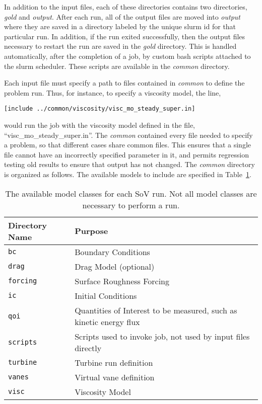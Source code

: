 In addition to the input files, each of these directories contains two
directories, {\it gold} and {\it output}. After each run, all of the
output files are moved into {\it output} where they are saved in a
directory labeled by the unique slurm id for that particular run. In
addition, if the run exited successfully, then the output files
necessary to restart the run are saved in the {\it gold} directory. 
This is handled automatically, after the completion of a job, by custom
bash scripts attached to the slurm scheduler. These scripts are
available in the {\it common} directory. 

Each input file must specify a path to files contained in {\it common}
to define the problem run. Thus, for instance, to specify a viscosity
model, the line, 
\begin{verbatim}
[include ../common/viscosity/visc_mo_steady_super.in]
\end{verbatim}
would run the job with the viscosity model defined in the file,
``visc\_mo\_steady\_super.in''.  
The {\it common} contained every file needed to specify a problem, so
that different cases share common files. This ensures that a single file
cannot have an incorrectly specified parameter in it, and permits
regression testing old results to ensure that output has not changed. 
The {\it common} directory is organized as follows. The available models
to include are specified in Table~\ref{tbl:run}. 

\begin{table}
\centering
\caption{%
  The available model classes for each SoV run. Not all model classes
 are necessary to perform a run.\label{tbl:run}
}
\begin{small}
\begin{tabular}{p{}|p{}}
Directory Name & Purpose \\ \hline \hline
 \texttt{bc}       & Boundary Conditions \\
 \texttt{drag}       & Drag Model (optional) \\
 \texttt{forcing}       & Surface Roughness Forcing \\
 \texttt{ic}       & Initial Conditions \\
 \texttt{qoi}       & Quantities of Interest to be measured, such as
     kinetic energy flux \\
 \texttt{scripts}       & Scripts used to invoke job, not used by input
     files directly \\
 \texttt{turbine}       & Turbine run definition \\
 \texttt{vanes}       & Virtual vane definition \\
 \texttt{visc}       & Viscosity Model \\
\end{tabular}
\end{small}
\end{table}



